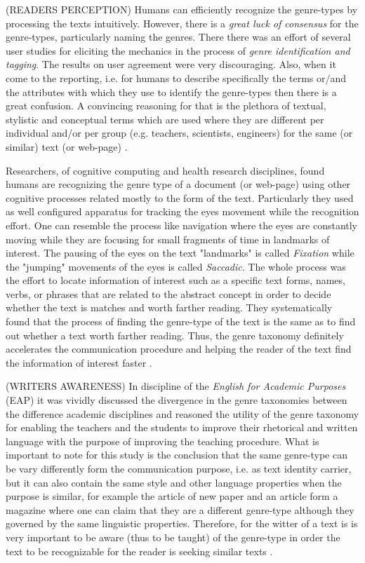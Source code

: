 (READERS PERCEPTION) Humans can efficiently recognize the genre-types by processing the texts intuitively. However, there is a \textit{great luck of consensus} for the genre-types, particularly naming the genres. There there was an effort of several user studies for eliciting the mechanics in the process of \textit{genre identification and tagging}. The results on user agreement were very discouraging. Also, when it come to the reporting, i.e. for humans to describe specifically the terms or/and the attributes with which they use to identify the genre-types then there is a great confusion. A convincing reasoning for that is the plethora of textual, stylistic and conceptual terms which are used where they are different per individual and/or per group (e.g. teachers, scientists, engineers) for the same (or similar) text (or web-page) \parencite{roussinov2001genre, crowston2011problems}. 

Researchers, of cognitive computing and health research disciplines, found humans are recognizing the genre type of a document (or web-page) using other cognitive processes related mostly to the form of the text. Particularly they used as well configured apparatus for tracking the eyes movement while the recognition effort. One can resemble the process like navigation where the eyes are constantly moving while they are focusing for small fragments of time in landmarks of interest. The pausing of the eyes on the text "landmarks" is called \textit{Fixation} while the "jumping" movements of the eyes is called \textit{Saccadic}. The whole process was the effort to locate information of interest such as a specific text forms, names, verbs, or phrases that are related to the abstract concept in order to decide whether the text is matches and worth farther reading. They systematically found that the process of finding the genre-type of the text is the same as to find out whether a text worth farther reading. Thus, the genre taxonomy definitely accelerates the communication procedure and helping the reader of the text find the information of interest faster \parencite{clark2014you}.

(WRITERS AWARENESS) In discipline of the \textit{English for Academic Purposes} (EAP)  it was vividly discussed the divergence in the genre taxonomies between the difference academic disciplines and reasoned the utility of the genre taxonomy for enabling the teachers and the students to improve their rhetorical and written language with the purpose of improving the teaching procedure. What is important to note for this study is the conclusion that the same genre-type can be vary differently form the communication purpose, i.e. as text identity carrier, but it can also contain the same style and other language properties when the purpose is similar, for example the article of new paper and an article form a magazine where one can claim that they are a different genre-type although they governed by the same linguistic properties. Therefore, for the witter of a text is is very important to be aware (thus to be taught) of the genre-type in order the text to be recognizable for the reader is seeking similar texts \parencite{hardy2016genre,melissourgou2017genre,al2017genre}.

